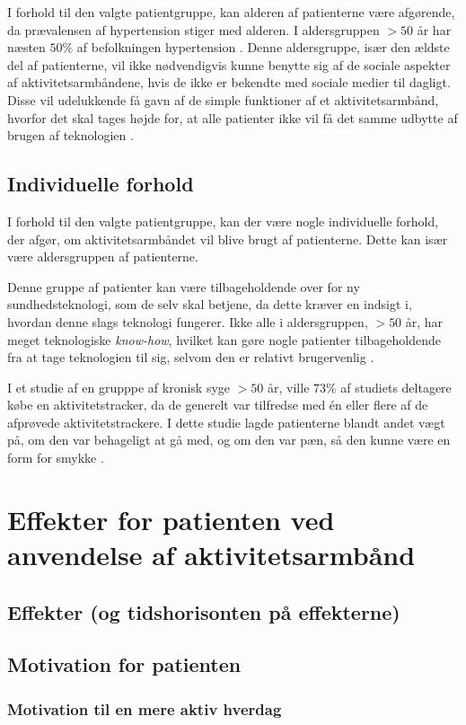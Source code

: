 I forhold til den valgte patientgruppe, kan alderen af patienterne være afgørende, da prævalensen af hypertension stiger med alderen. I aldersgruppen $>50$ år har næsten $50 \%$ af befolkningen hypertension \citep{kronborg2008}. Denne aldersgruppe, især den ældste del af patienterne, vil ikke nødvendigvis kunne benytte sig af de sociale aspekter af aktivitetsarmbåndene, hvis de ikke er bekendte med sociale medier til dagligt. Disse vil udelukkende få gavn af de simple funktioner af et aktivitetsarmbånd, hvorfor det skal tages højde for, at alle patienter ikke vil få det samme udbytte af brugen af teknologien \citep{mercer2016}.

\subsection{Individuelle forhold}
I forhold til den valgte patientgruppe, kan der være nogle individuelle forhold, der afgør, om aktivitetsarmbåndet vil blive brugt af patienterne. Dette kan især være aldersgruppen af patienterne. 

Denne gruppe af patienter kan være tilbageholdende over for ny sundhedsteknologi, som de selv skal betjene, da dette kræver en indsigt i, hvordan denne slags teknologi fungerer. Ikke alle i aldersgruppen, $>50$ år, har meget teknologiske \textit{know-how}, hvilket kan gøre nogle patienter tilbageholdende fra at tage teknologien til sig, selvom den er relativt brugervenlig \citep{mercer2016}. 

I et studie af en grupppe af kronisk syge $>50$ år, ville $73 \%$ af studiets deltagere købe en aktivitetstracker, da de generelt var tilfredse med én eller flere af de afprøvede aktivitetstrackere. I dette studie lagde patienterne blandt andet vægt på, om den var behageligt at gå med, og om den var pæn, så den kunne være en form for smykke \citep{mercer2016}.

\section{Effekter for patienten ved anvendelse af aktivitetsarmbånd}
\subsection{Effekter (og tidshorisonten på effekterne)}
\subsection{Motivation for patienten}
\subsubsection{Motivation til en mere aktiv hverdag}
